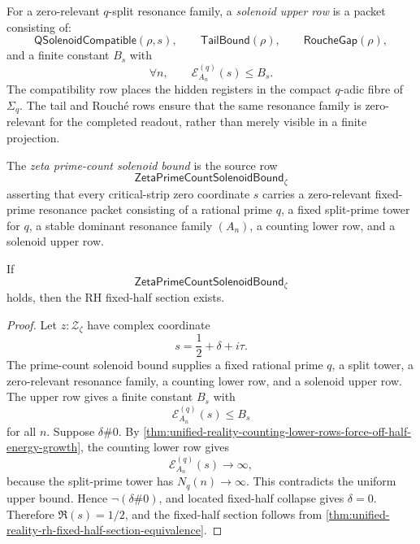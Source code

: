 \begin{definition}
\label{def:unified-reality-solenoid-upper-row}
For a zero-relevant $q$-split resonance family, a \emph{solenoid upper
row} is a packet consisting of:
$$
\mathsf{QSolenoidCompatible}(\rho,s),
\qquad
\mathsf{TailBound}(\rho),
\qquad
\mathsf{RoucheGap}(\rho),
$$
and a finite constant $B_s$ with
$$
\forall n,\qquad
\mathcal E_{A_n}^{(q)}(s)\le B_s.
$$
The compatibility row places the hidden registers in the compact
$q$-adic fibre of $\Sigma_q$.  The tail and Rouch\'e rows ensure that
the same resonance family is zero-relevant for the completed readout,
rather than merely visible in a finite projection.
\end{definition}

\begin{definition}
\label{def:unified-reality-zeta-prime-count-solenoid-bound}
The \emph{zeta prime-count solenoid bound} is the source row
$$
\mathsf{ZetaPrimeCountSolenoidBound}_{\zeta}
$$
asserting that every critical-strip zero coordinate $s$ carries a
zero-relevant fixed-prime resonance packet consisting of a rational prime
$q$, a fixed split-prime tower for $q$, a stable dominant resonance
family $(A_n)$, a counting lower row, and a solenoid upper row.
\end{definition}

\begin{theorem}
\label{thm:unified-reality-prime-count-solenoid-bound-conditionally-sufficient}
If
$$
\mathsf{ZetaPrimeCountSolenoidBound}_{\zeta}
$$
holds, then the RH fixed-half section exists.
\end{theorem}

\begin{proof}
Let $z:\mathcal Z_{\zeta}$ have complex coordinate
$$
s=\frac12+\delta+i\tau.
$$
The prime-count solenoid bound supplies a fixed rational prime $q$, a
split tower, a zero-relevant resonance family, a counting lower row, and
a solenoid upper row.  The upper row gives a finite constant $B_s$ with
$$
\mathcal E_{A_n}^{(q)}(s)\le B_s
$$
for all $n$.  Suppose $\delta\#0$.  By
\autoref{thm:unified-reality-counting-lower-rows-force-off-half-energy-growth},
the counting lower row gives
$$
\mathcal E_{A_n}^{(q)}(s)\to\infty,
$$
because the split-prime tower has $N_q(n)\to\infty$.  This contradicts
the uniform upper bound.  Hence $\neg(\delta\#0)$, and located
fixed-half collapse gives $\delta=0$.  Therefore $\Re(s)=1/2$, and the
fixed-half section follows from
\autoref{thm:unified-reality-rh-fixed-half-section-equivalence}.
\end{proof}

